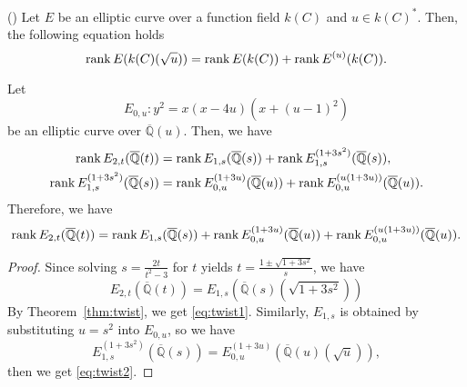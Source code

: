 \documentclass[main]{subfiles}
\begin{document}
\begin{thm}{(\cite[Exercise 10.16]{ref:aec})}
    \label{thm:twist}
    Let $E$ be an elliptic curve over a function field $k(C)$ and $u \in k(C)^*$.
    Then, the following equation holds
    \begin{equation}
        \operatorname{rank} E(k(C)(\sqrt{u})) = \operatorname{rank} E(k(C)) + \operatorname{rank} E^{(u)}(k(C)).
    \end{equation}
\end{thm}

\begin{thm}
    Let
    \begin{equation}
        E_{0,u}: y^{2} = x(x - 4u)(x + (u - 1)^{2})
    \end{equation}
    be an elliptic curve over $\overline{\mathbb{Q}}(u)$.
    Then, we have
    \begin{align}
        \operatorname{rank} E_{2,t}(\overline{\mathbb{Q}}(t))                & = \operatorname{rank} E_{1,s}(\overline{\mathbb{Q}}(s)) + \operatorname{rank} E_{1,s}^{(1 + 3s^{2})}(\overline{\mathbb{Q}}(s)), \label{eq:twist1}           \\
        \operatorname{rank} E_{1,s}^{(1 + 3s^{2})}(\overline{\mathbb{Q}}(s)) & = \operatorname{rank} E_{0,u}^{(1 + 3u)}(\overline{\mathbb{Q}}(u)) + \operatorname{rank} E_{0,u}^{(u(1 + 3u))}(\overline{\mathbb{Q}}(u)). \label{eq:twist2}
    \end{align}
    Therefore, we have
    \begin{equation}
        \operatorname{rank} E_{2,t}(\overline{\mathbb{Q}}(t)) = \operatorname{rank} E_{1,s}(\overline{\mathbb{Q}}(s)) + \operatorname{rank} E_{0,u}^{(1 + 3u)}(\overline{\mathbb{Q}}(u)) + \operatorname{rank} E_{0,u}^{(u(1 + 3u))}(\overline{\mathbb{Q}}(u)).
    \end{equation}
\end{thm}
\begin{proof}
    Since solving $s = \frac{2t}{t^{2} - 3}$ for $t$ yields $t = \frac{1 \pm \sqrt{1 + 3s^{2}}}{s}$, we have
    \begin{equation}
        E_{2,t}(\overline{\mathbb{Q}}(t)) = E_{1,s}(\overline{\mathbb{Q}}(s)(\sqrt{1 + 3s^{2}}))
    \end{equation}
    By Theorem~\ref{thm:twist}, we get \eqref{eq:twist1}.
    Similarly, $E_{1,s}$ is obtained by substituting $u = s^{2}$ into $E_{0,u}$, so we have
    \begin{equation}
        E_{1,s}^{(1 + 3s^{2})}(\overline{\mathbb{Q}}(s)) = E_{0,u}^{(1 + 3u)}(\overline{\mathbb{Q}}(u)(\sqrt{u})),
    \end{equation}
    then we get \eqref{eq:twist2}.
\end{proof}
\end{document}
